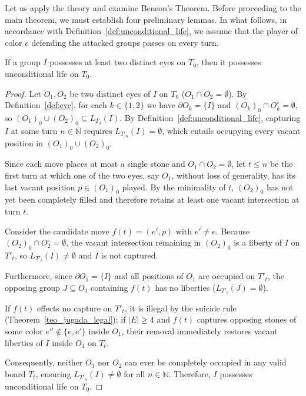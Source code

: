 Let us apply the theory and examine Benson's Theorem. Before proceeding to the main theorem, we must establish four preliminary lemmas. In what follows, in accordance with Definition~\ref{def:unconditional_life}, we assume that the player of color $e$ defending the attacked groups passes on every turn.

\begin{lemma}\label{lem_1_benson}
	If a group $I$ possesses at least two distinct eyes on $T_0$, then it possesses unconditional life on $T_0$.
\end{lemma}

\begin{proof}
	Let $O_1, O_2$ be two distinct eyes of $I$ on $T_0$ ($O_1 \cap O_2 = \emptyset$). By Definition~\ref{def:eye}, for each $k \in \{1, 2\}$ we have $\partial O_k = \{I\}$ and $(O_k)_0 \cap O_k^\circ = \emptyset$, so $(O_1)_0 \cup (O_2)_0 \subseteq L_{T_0}(I)$. By Definition~\ref{def:unconditional_life}, capturing $I$ at some turn $n \in \mathbb{N}$ requires $L_{T'_n}(I) = \emptyset$, which entails occupying every vacant position in $(O_1)_0 \cup (O_2)_0$.
	
	Since each move places at most a single stone and $O_1 \cap O_2 = \emptyset$, let $t \le n$ be the first turn at which one of the two eyes, say $O_1$, without loss of generality, has its last vacant position $p \in (O_1)_0$ played. By the minimality of $t$, $(O_2)_0$ has not yet been completely filled and therefore retains at least one vacant intersection at turn $t$.
	
	Consider the candidate move $f(t) = (e', p)$ with $e' \neq e$. Because $(O_2)_0 \cap O_2^\circ = \emptyset$, the vacant intersection remaining in $(O_2)_0$ is a liberty of $I$ on $T'_t$, so $L_{T'_t}(I) \neq \emptyset$ and $I$ is not captured. 
	
	Furthermore, since $\partial O_1 = \{I\}$ and all positions of $O_1$ are occupied on $T'_t$, the opposing group $J \subseteq O_1$ containing $f(t)$ has no liberties ($L_{T'_t}(J) = \emptyset$).
	
	If $f(t)$ effects no capture on $T'_t$, it is illegal by the suicide rule (Theorem~\ref{teo_jugada_legal}); if $|E| \ge 4$ and $f(t)$ captures opposing stones of some color $e'' \notin \{e, e'\}$ inside $O_1$, their removal immediately restores vacant liberties of $I$ inside $O_1$ on $T_t$.
	
	Consequently, neither $O_1$ nor $O_2$ can ever be completely occupied in any valid board $T_t$, ensuring $L_{T'_n}(I) \neq \emptyset$ for all $n \in \mathbb{N}$. Therefore, $I$ possesses unconditional life on $T_0$.
\end{proof}

